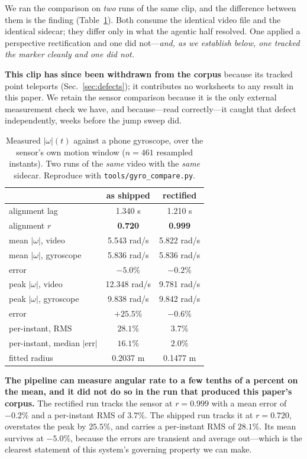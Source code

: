 \documentclass[conference]{IEEEtran}
\begin{document}
We ran the comparison on \emph{two} runs of the same clip, and the difference
between them is the finding (Table~\ref{tab:gyro}). Both consume the identical
video file and the identical sidecar; they differ only in what the agentic half
resolved. One applied a perspective rectification and one did not---\emph{and,
as we establish below, one tracked the marker cleanly and one did not.}

\textbf{This clip has since been withdrawn from the corpus} because its tracked
point teleports (Sec.~\ref{sec:defects}); it contributes no worksheets to any
result in this paper. We retain the sensor comparison because it is the only
external measurement check we have, and because---read correctly---it caught
that defect independently, weeks before the jump sweep did.

\begin{table}[t]
\caption{Measured $|\omega|(t)$ against a phone gyroscope, over the sensor's own
motion window ($n = 461$ resampled instants). Two runs of the \emph{same} video
with the \emph{same} sidecar. Reproduce with
\texttt{tools/gyro\_compare.py}.}
\label{tab:gyro}
\centering
\footnotesize
\begin{tabular}{@{}lcc@{}}
\toprule
& \textbf{as shipped} & \textbf{rectified} \\
\midrule
alignment lag & 1.340 s & 1.210 s \\
alignment $r$ & \textbf{0.720} & \textbf{0.999} \\
\midrule
mean $|\omega|$, video & 5.543 rad/s & 5.822 rad/s \\
mean $|\omega|$, gyroscope & 5.836 rad/s & 5.836 rad/s \\
\quad error & $-5.0\%$ & $\mathbf{-0.2\%}$ \\
\addlinespace[2pt]
peak $|\omega|$, video & 12.348 rad/s & 9.781 rad/s \\
peak $|\omega|$, gyroscope & 9.838 rad/s & 9.842 rad/s \\
\quad error & $\mathbf{+25.5\%}$ & $-0.6\%$ \\
\addlinespace[2pt]
per-instant, RMS & $28.1\%$ & $\mathbf{3.7\%}$ \\
per-instant, median $|$err$|$ & $16.1\%$ & $2.0\%$ \\
\midrule
fitted radius & 0.2037 m & 0.1477 m \\
\bottomrule
\end{tabular}
\end{table}

\textbf{The pipeline can measure angular rate to a few tenths of a percent on
the mean, and it did not do so in the run that produced this paper's corpus.}
The rectified run tracks the sensor at $r = 0.999$ with a mean error of
$-0.2\%$ and a per-instant RMS of $3.7\%$. The shipped run tracks it at
$r = 0.720$, overstates the peak by $25.5\%$, and carries a per-instant RMS of
$28.1\%$. Its mean survives at $-5.0\%$, because the errors are transient and
average out---which is the clearest statement of this system's governing
property we can make.
\end{document}
